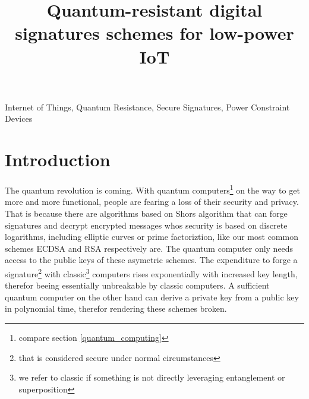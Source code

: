 \documentclass[conference]{IEEEtran}
\newcommand{\comment}[1]{}
\begin{document}
\title{Quantum-resistant digital signatures schemes for low-power IoT}

\author{
}

\maketitle

\begin{abstract}
\end{abstract}

\begin{IEEEkeywords}
Internet of Things, Quantum Resistance, Secure Signatures, Power Constraint Devices
\end{IEEEkeywords}


\section{Introduction}
\comment{ %
„principles of data integrity, message authentication, and nonrepudiation, are going to have profound aftermath on sensory data in terms of security and privacy.“ \cite{QR_sigs}
} %

The quantum revolution is coming. With quantum computers\footnote{compare section \ref{quantum_computing}} on the way to get more and more functional, people are fearing a loss of their security and privacy.
That is because there are algorithms based on Shors algorithm that can forge signatures and decrypt encrypted messages whos security is based on discrete logarithms, including elliptic curves or prime factoriztion, like our most common schemes ECDSA and RSA respectively are.
The quantum computer only needs access to the public keys of these asymetric schemes.
The expenditure to forge a signature\footnote{that is considered secure under normal circumstances 
} with classic\footnote{we refer to classic if something is not directly leveraging entanglement or superposition} computers rises exponentially with increased key length, therefor beeing essentially unbreakable by classic computers.
A sufficient quantum computer on the other hand can derive a private key from a public key in polynomial time, therefor rendering these schemes broken.
\end{document}
